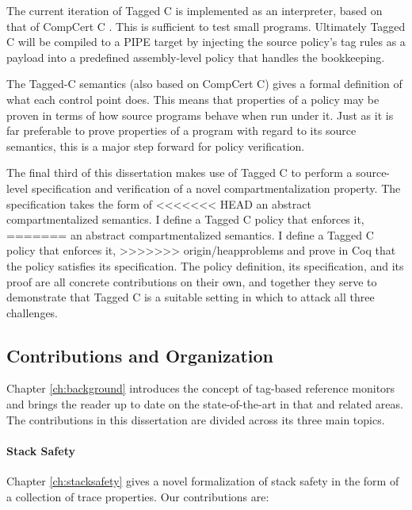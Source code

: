 \documentclass{report}
\begin{document}
The current iteration of Tagged C is implemented as an interpreter, based on that of
CompCert C \cite{Leroy09:CompCert}. This is sufficient to test small programs. Ultimately
Tagged C will be compiled to a PIPE target by injecting the source policy's tag rules
as a payload into a predefined assembly-level policy that handles the bookkeeping.

The Tagged-C semantics (also based on CompCert C) gives a formal definition of what each
control point does. This means that properties of a policy may be proven in terms of how
source programs behave when run under it. Just as it is far preferable to prove properties
of a program with regard to its source semantics, this is a major step forward for policy
verification.

The final third of this dissertation makes use of Tagged C to perform a source-level specification and
verification of a novel compartmentalization property. The specification takes the form of
<<<<<<< HEAD
an abstract compartmentalized semantics. %
I define a Tagged C policy that enforces it,
=======
an abstract compartmentalized semantics. I define a Tagged C policy that enforces it,
>>>>>>> origin/heapproblems
and prove in Coq that the policy satisfies its specification. The policy definition, its
specification, and its proof are all concrete contributions on their own, and together they
serve to demonstrate that Tagged C is a suitable setting in which to attack all three
challenges.

\subsection{Contributions and Organization}

Chapter \ref{ch:background} introduces the concept of tag-based reference monitors
and brings the reader up to date on the state-of-the-art in that and related areas.
The contributions in this dissertation are divided across its three main topics.

\paragraph{Stack Safety}

Chapter \ref{ch:stacksafety} gives a novel formalization of stack safety in the
form of a collection of trace properties. Our contributions are:
\end{document}
